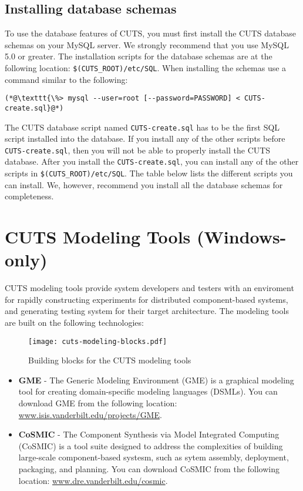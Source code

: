 \subsection{Installing database schemas}

To use the database features of CUTS, you must first install the CUTS database 
schemas on your MySQL server. We strongly recommend that you use MySQL 5.0 or 
greater. The installation scripts for the database schemas are at the following 
location: \texttt{\$(CUTS\_ROOT)/etc/SQL}. When installing the schemas use a 
command similar to the following:
\begin{lstlisting}
(*@\texttt{\%> mysql --user=root [--password=PASSWORD] < CUTS-create.sql}@*)
\end{lstlisting}
The CUTS database script named \texttt{CUTS-create.sql} has to be the first SQL 
script installed into the database. If you install any of the other scripts before
\texttt{CUTS-create.sql}, then you will not be able to properly install the CUTS 
database. After you install the \texttt{CUTS-create.sql}, you can install any of 
the other scripts in \texttt{\$(CUTS\_ROOT)/etc/SQL}. The table below lists the
different scripts you can install. We, however, recommend you install all the 
database schemas for completeness.

\section{CUTS Modeling Tools (Windows-only)}

CUTS modeling tools provide system developers and testers with an enviroment
for rapidly constructing experiments for distributed component-based systems,
and generating testing system for their target architecture. The modeling
tools are built on the following technologies:
\begin{figure}[htbp]
  \centering
  \texttt{[image: cuts-modeling-blocks.pdf]}
  \caption{Building blocks for the CUTS modeling tools}
  \label{fig:cuts-modeling-blocks}
\end{figure}

\begin{itemize}
  \item \textbf{GME} - The Generic Modeling Environment (GME) is a graphical
  modeling tool for creating domain-specific modeling languages (DSMLs). You
  can download GME from the following location: \url{www.isis.vanderbilt.edu/projects/GME}.

  \item \textbf{CoSMIC} - The Component Synthesis via Model Integrated 
  Computing (CoSMIC) is a tool suite designed to address the complexities of
  building large-scale component-based systesm, such as sytem assembly, 
  deployment, packaging, and planning. You can download CoSMIC from the following
  location: \url{www.dre.vanderbilt.edu/cosmic}.
\end{itemize}

